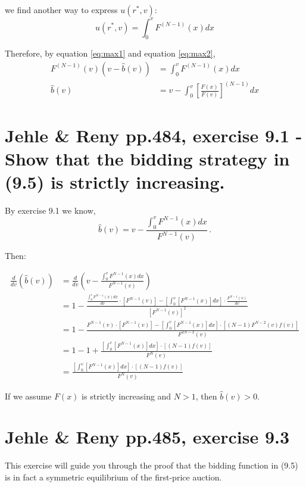 \documentclass{article}
\begin{document}
we find another way to express $u(r^*,v)$:
\begin{equation}
u(r^*,v) = \int_0^v F^{(N-1)}(x) dx
    \label{eq:max2}   
\end{equation}


Therefore, by equation \ref{eq:max1} and equation \ref{eq:max2},
\begin{align*}
F^{(N-1)}(v) (v-\hat{b}(v)) &= \int_0^v F^{(N-1)}(x) dx \\
\hat{b}(v)&= v - \int_0^v \left[\frac{F(x)}{F(v)}\right]^{(N-1)} dx 
\end{align*}


\section{Jehle \& Reny pp.484, exercise 9.1 - Show that the bidding strategy in (9.5) is strictly increasing.}

By exercise 9.1 we know,
$$\hat{b}(v) = v - \frac{\int_0^v F^{N-1}(x) dx}{F^{N-1}(v)} \, .$$

Then:

\begin{align*}
  \frac{d}{dv}\left( \hat{b}(v) \right) &= \frac{d}{dv}\left( v - \frac{\int_0^v F^{N-1}(x) dx}{F^{N-1}(v)} \right) \\
  &= 1 - \frac{\frac{\int_0^vF^{N-1}(x) dx }{dv} \cdot [F^{N-1}(v)]- \left[\int_0^v[F^{N-1}(x)] dx \right] \cdot \frac{F^{N-1}(v)}{dv}}{\left[F^{N-1}(v)\right]^2}\\
  &= 1 - \frac{F^{N-1}(v) \cdot [F^{N-1}(v)] - \left[\int_0^v[F^{N-1}(x)] dx \right] \cdot [(N-1) F^{N-2}(v) f(v)]} {F^{2N-2}(v)} \\
  &= 1 - 1 + \frac{\left[\int_0^v[F^{N-1}(x)] dx \right] \cdot [(N-1) f(v)]} {F^{N}(v)} \\
  &= \frac{\left[\int_0^v[F^{N-1}(x)] dx \right] \cdot [(N-1) f(v)]} {F^{N}(v)}
\end{align*}

If we assume $F(x)$ is strictly increasing and $N > 1$, then $\hat{b}(v) > 0$.

\section{Jehle \& Reny pp.485, exercise 9.3}

This exercise will guide you through the proof that the bidding function in (9.5) is in fact a symmetric
equilibrium of the first-price auction.
\end{document}
